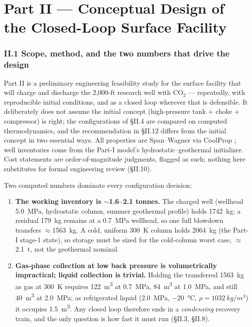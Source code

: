 
\part*{Part II --- Conceptual Design of the Closed-Loop Surface
Facility}

\section{II.1 Scope, method, and the two numbers that drive the design}

Part II is a preliminary engineering feasibility study for the surface
facility that will charge and discharge the 2,000-ft research well
with CO$_2$ --- repeatedly, with reproducible initial conditions, and
as a closed loop wherever that is defensible. It deliberately does not
assume the initial concept (high-pressure tank + choke + compressor)
is right; the configurations of \S II.4 are compared on computed
thermodynamics, and the recommendation in \S II.12 differs from the
initial concept in two essential ways. All properties are Span--Wagner
\citep{span1996} via CoolProp \citep{bell2014}; well inventories come
from the Part-I model's hydrostatic--geothermal initializer. Cost
statements are order-of-magnitude judgments, flagged as such; nothing
here substitutes for formal engineering review (\S II.10).

Two computed numbers dominate every configuration decision:
\begin{enumerate}
\item \textbf{The working inventory is $\sim$1.6--2.1 tonnes.} The
charged well (wellhead \SI{5.0}{MPa}, hydrostatic column, summer
geothermal profile) holds \SI{1742}{kg}; a residual
\SI{179}{kg} remains at a \SI{0.7}{MPa} wellhead, so one full
blowdown transfers $\approx$\SI{1563}{kg}. A cold, uniform
\SI{300}{K} column holds \SI{2064}{kg} (the Part-I stage-1 state), so
storage must be sized for the cold-column worst case,
$\approx$\SI{2.1}{t}, not the geothermal nominal.
\item \textbf{Gas-phase collection at low back pressure is
volumetrically impractical; liquid collection is trivial.} Holding the
transferred \SI{1563}{kg} as gas at \SI{300}{K} requires
\SI{122}{m^3} at \SI{0.7}{MPa}, \SI{84}{m^3} at \SI{1.0}{MPa}, and
still \SI{40}{m^3} at \SI{2.0}{MPa}; as refrigerated liquid
(\SI{2.0}{MPa}, \SI{-20}{\celsius}, $\rho = \SI{1032}{kg/m^3}$) it
occupies \SI{1.5}{m^3}. Any closed loop therefore ends in a
\emph{condensing} recovery train, and the only question is how fast
it must run (\S II.3, \S II.8).
\end{enumerate}

